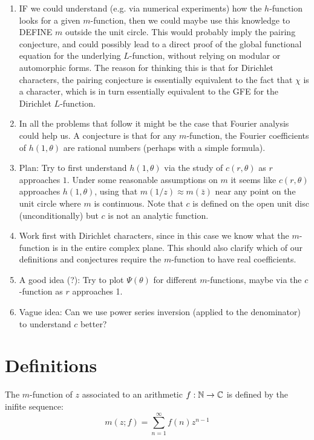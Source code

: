 \documentclass[a4paper]{amsart}
\begin{document}
\begin{enumerate}
\item IF we could understand (e.g. via numerical experiments) how the $h$-function looks for a given $m$-function, then we could maybe use this knowledge to DEFINE $m$ outside the unit circle. This would probably imply the pairing conjecture, and could possibly lead to a direct proof of the global functional equation for the underlying $L$-function, without relying on modular or automorphic forms. The reason for thinking this is that for Dirichlet characters, the pairing conjecture is essentially equivalent to the fact that $\chi$ is a character, which is in turn essentially equivalent to the GFE for the Dirichlet $L$-function.
\item In all the problems that follow it might be the case that Fourier analysis could help us. A conjecture is that for any $m$-function, the Fourier coefficients of $h(1, \theta)$ are rational numbers (perhaps with a simple formula).
\item Plan: Try to first understand $h(1, \theta)$ via the study of $c(r, \theta)$ as $r$ approaches $1$. Under some reasonable assumptions on $m$ it seems like $c(r, \theta)$ approaches $h(1, \theta)$, using that $m(1/z) \approx m(\bar{z})$ near any point on the unit circle where $m$ is continuous. Note that $c$ is defined on the open unit disc (unconditionally) but $c$ is not an analytic function.
\item Work first with Dirichlet characters, since in this case we know what the $m$-function is in the entire complex plane. This should also clarify which of our definitions and conjectures require the $m$-function to have real coefficients.
\item A good idea (?): Try to plot $\Psi(\theta)$ for different $m$-functions, maybe via the $c$-function as $r$ approaches 1.
\item Vague idea: Can we use power series inversion (applied to the denominator) to understand $c$ better?
\end{enumerate}


\section{Definitions}

\begin{definition}
  The $m$-function of $z$ associated to an arithmetic $f : \mathbb{N} \to \mathbb{C}$ is defined by the inifite sequence:
  $$m(z; f) = \sum_{n = 1}^{\infty} f(n) z^{n - 1}$$
\end{definition}
\end{document}
